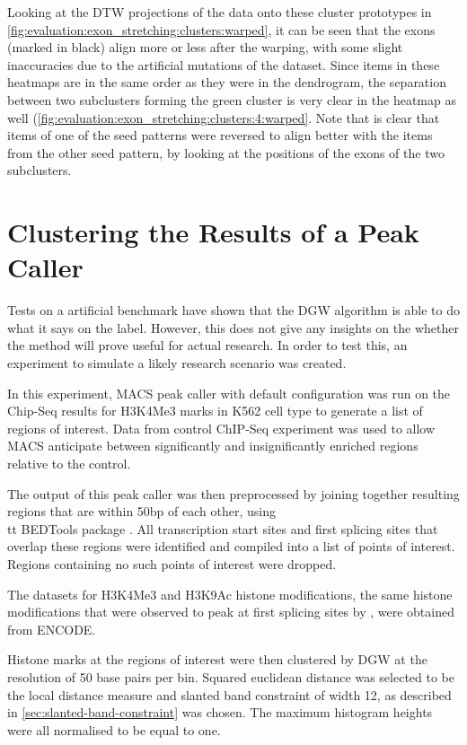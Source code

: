 \documentclass[parskip]{cs4rep}
\newcommand{\histonemodification}[1]{#1}
\newcommand{\celltype}[1]{#1}
\begin{document}
Looking at the DTW projections of the data onto these cluster prototypes in \autoref{fig:evaluation:exon_stretching:clusters:warped}, it can be seen that the exons (marked in black) align more or less after the warping, with some slight inaccuracies due to the artificial mutations of the dataset. Since items in these heatmaps are in the same order as they were in the dendrogram, the separation between two subclusters forming the green cluster is very clear in the heatmap as well (\autoref{fig:evaluation:exon_stretching:clusters:4:warped}. Note that is clear that items of one of the seed patterns were reversed to align better with the items from the other seed pattern, by looking at the positions of the exons of the two subclusters.

\section{Clustering the Results of a Peak Caller}
\label{sec:macs-experiment}
Tests on a artificial benchmark have shown that the DGW algorithm is able to do what it says on the label. However, this does not give any insights on the whether the method will prove useful for actual research. In order to test this, an experiment to simulate a likely research scenario was created.

In this experiment, MACS peak caller with default configuration \cite{Zhang:2008wp} was run on the Chip-Seq results for \histonemodification{H3K4Me3} marks in \celltype{K562} cell type to generate a list of regions of interest. Data from control ChIP-Seq experiment was used to allow MACS anticipate between significantly and insignificantly enriched regions relative to the control.

The output of this peak caller was then preprocessed by joining together resulting regions that are within 50bp of each other, using {\\tt BEDTools} package \cite{Quinlan:2010ur}. 
All transcription start sites and first splicing sites that overlap these regions were identified and compiled into a list of points of interest. Regions containing no such points of interest were dropped.

The datasets for \histonemodification{H3K4Me3} and \histonemodification{H3K9Ac} histone modifications, the same histone modifications that were observed to peak at first splicing sites by \cite{Bieberstein:2012tf}, were obtained from ENCODE.

Histone marks at the regions of interest were then clustered by DGW at the resolution of 50 base pairs per bin. Squared euclidean distance was selected to be the local distance measure and slanted band constraint of width 12, as described in \autoref{sec:slanted-band-constraint} was chosen. The maximum histogram heights were all normalised to be equal to one.
\end{document}
